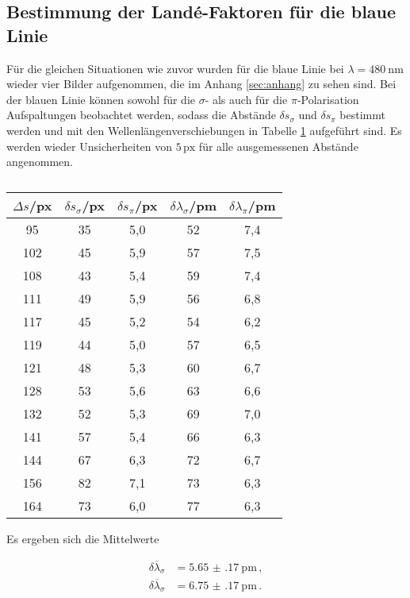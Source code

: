 \subsection{Bestimmung der Landé-Faktoren für die blaue Linie}

Für die gleichen Situationen wie zuvor wurden für die blaue Linie bei $\lambda=\SI{480}{\nano\meter}$ wieder vier Bilder aufgenommen, die im Anhang \ref{sec:anhang} zu sehen sind.
Bei der blauen Linie können sowohl für die $\sigma$- als auch für die $\pi$-Polarisation Aufspaltungen beobachtet werden, sodass die Abstände ${\delta s}_\sigma$ und ${\delta s}_\pi$ bestimmt werden und mit den Wellenlängenverschiebungen in Tabelle \ref{tab:blau} aufgeführt sind. Es werden wieder Unsicherheiten von $5\,\text{px}$ für alle ausgemessenen Abstände angenommen.

\begin{table}[htp]
	\begin{center}
    \caption{\cite{insert caption}}
    \label{tab:blau}
		\begin{tabular}{ccccc}
		\toprule
			{$\Delta s$/px} & {${\delta s}_\sigma$/px} & {${\delta s}_\pi$/px} & {${\delta \lambda}_\sigma$/pm} & {${\delta \lambda}_\pi$/pm}\\
			\midrule
			 95 & 35 & 5,0 & 52 & 7,4\\
			102 & 45 & 5,9 & 57 & 7,5\\
			108 & 43 & 5,4 & 59 & 7,4\\
			111 & 49 & 5,9 & 56 & 6,8\\
			117 & 45 & 5,2 & 54 & 6,2\\
			119 & 44 & 5,0 & 57 & 6,5\\
			121 & 48 & 5,3 & 60 & 6,7\\
			128 & 53 & 5,6 & 63 & 6,6\\
			132 & 52 & 5,3 & 69 & 7,0\\
			141 & 57 & 5,4 & 66 & 6,3\\
			144 & 67 & 6,3 & 72 & 6,7\\
			156 & 82 & 7,1 & 73 & 6,3\\
			164 & 73 & 6,0 & 77 & 6,3\\
		\bottomrule
		\end{tabular}
	\end{center}
\end{table}

Es ergeben sich die Mittelwerte

\begin{align*}
  \overline{{\delta \lambda}_\sigma} &= \SI{5.65(17)}{\pico\meter}\,,\\
  \overline{{\delta \lambda}_\sigma} &= \SI{6.75(17)}{\pico\meter}\,.
\end{align*}

